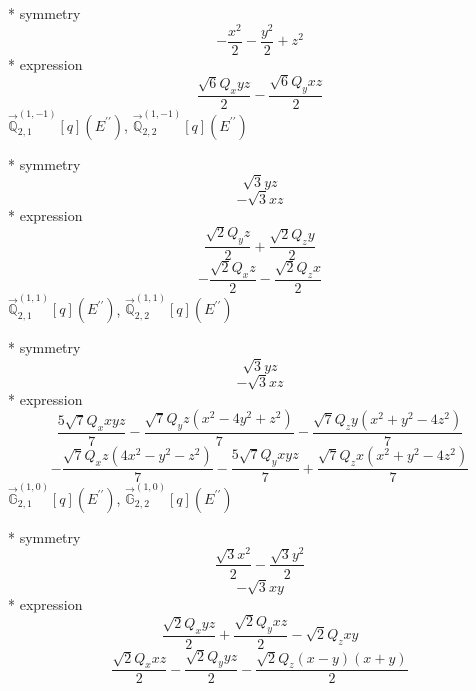 \documentclass[fleqn,8pt]{jsarticle}
\begin{document}
\noindent\quad ** symmetry
\begin{dmath*}
- \frac{x^{2}}{2} - \frac{y^{2}}{2} + z^{2}
\end{dmath*}
\noindent\quad ** expression
\begin{dmath*}
\frac{\sqrt{6} Q_{x} y z}{2} - \frac{\sqrt{6} Q_{y} x z}{2}
\end{dmath*}
\noindent\quad $\vec{\mathbb{Q}}_{2,1}^{(1,-1)}[q](E^{\prime\prime})$, $\vec{\mathbb{Q}}_{2,2}^{(1,-1)}[q](E^{\prime\prime})$

\noindent\quad ** symmetry
\begin{dmath*}
\sqrt{3} y z
\end{dmath*}
\begin{dmath*}
- \sqrt{3} x z
\end{dmath*}
\noindent\quad ** expression
\begin{dmath*}
\frac{\sqrt{2} Q_{y} z}{2} + \frac{\sqrt{2} Q_{z} y}{2}
\end{dmath*}
\begin{dmath*}
- \frac{\sqrt{2} Q_{x} z}{2} - \frac{\sqrt{2} Q_{z} x}{2}
\end{dmath*}
\noindent\quad $\vec{\mathbb{Q}}_{2,1}^{(1,1)}[q](E^{\prime\prime})$, $\vec{\mathbb{Q}}_{2,2}^{(1,1)}[q](E^{\prime\prime})$

\noindent\quad ** symmetry
\begin{dmath*}
\sqrt{3} y z
\end{dmath*}
\begin{dmath*}
- \sqrt{3} x z
\end{dmath*}
\noindent\quad ** expression
\begin{dmath*}
\frac{5 \sqrt{7} Q_{x} x y z}{7} - \frac{\sqrt{7} Q_{y} z \left(x^{2} - 4 y^{2} + z^{2}\right)}{7} - \frac{\sqrt{7} Q_{z} y \left(x^{2} + y^{2} - 4 z^{2}\right)}{7}
\end{dmath*}
\begin{dmath*}
- \frac{\sqrt{7} Q_{x} z \left(4 x^{2} - y^{2} - z^{2}\right)}{7} - \frac{5 \sqrt{7} Q_{y} x y z}{7} + \frac{\sqrt{7} Q_{z} x \left(x^{2} + y^{2} - 4 z^{2}\right)}{7}
\end{dmath*}
\noindent\quad $\vec{\mathbb{G}}_{2,1}^{(1,0)}[q](E^{\prime\prime})$, $\vec{\mathbb{G}}_{2,2}^{(1,0)}[q](E^{\prime\prime})$

\noindent\quad ** symmetry
\begin{dmath*}
\frac{\sqrt{3} x^{2}}{2} - \frac{\sqrt{3} y^{2}}{2}
\end{dmath*}
\begin{dmath*}
- \sqrt{3} x y
\end{dmath*}
\noindent\quad ** expression
\begin{dmath*}
\frac{\sqrt{2} Q_{x} y z}{2} + \frac{\sqrt{2} Q_{y} x z}{2} - \sqrt{2} Q_{z} x y
\end{dmath*}
\begin{dmath*}
\frac{\sqrt{2} Q_{x} x z}{2} - \frac{\sqrt{2} Q_{y} y z}{2} - \frac{\sqrt{2} Q_{z} \left(x - y\right) \left(x + y\right)}{2}
\end{dmath*}
\end{document}
